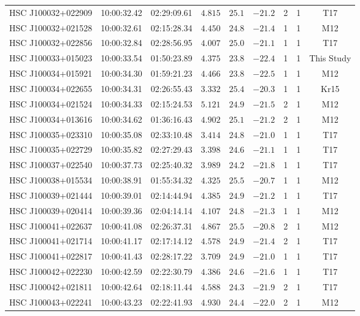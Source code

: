\documentclass[]{pasj01}
\begin{document}
{\begin{longtable}{ccccccccc}
HSC J100032+022909 & 10:00:32.42 & 02:29:09.61 & $4.815$ & $25.1$ & $-21.2$ & 2 & 1 & T17 \\
HSC J100032+021528 & 10:00:32.61 & 02:15:28.34 & $4.450$ & $24.8$ & $-21.4$ & 1 & 1 & M12 \\
HSC J100032+022856 & 10:00:32.84 & 02:28:56.95 & $4.007$ & $25.0$ & $-21.1$ & 1 & 1 & T17 \\
HSC J100033+015023 & 10:00:33.54 & 01:50:23.89 & $4.375$ & $23.8$ & $-22.4$ & 1 & 1 & This Study \\
HSC J100034+015921 & 10:00:34.30 & 01:59:21.23 & $4.466$ & $23.8$ & $-22.5$ & 1 & 1 & M12 \\
HSC J100034+022655 & 10:00:34.31 & 02:26:55.43 & $3.332$ & $25.4$ & $-20.3$ & 1 & 1 & Kr15 \\
HSC J100034+021524 & 10:00:34.33 & 02:15:24.53 & $5.121$ & $24.9$ & $-21.5$ & 2 & 1 & M12 \\
HSC J100034+013616 & 10:00:34.62 & 01:36:16.43 & $4.902$ & $25.1$ & $-21.2$ & 2 & 1 & M12 \\
HSC J100035+023310 & 10:00:35.08 & 02:33:10.48 & $3.414$ & $24.8$ & $-21.0$ & 1 & 1 & T17 \\
HSC J100035+022729 & 10:00:35.82 & 02:27:29.43 & $3.398$ & $24.6$ & $-21.1$ & 1 & 1 & T17 \\
HSC J100037+022540 & 10:00:37.73 & 02:25:40.32 & $3.989$ & $24.2$ & $-21.8$ & 1 & 1 & T17 \\
HSC J100038+015534 & 10:00:38.91 & 01:55:34.32 & $4.325$ & $25.5$ & $-20.7$ & 1 & 1 & M12 \\
HSC J100039+021444 & 10:00:39.01 & 02:14:44.94 & $4.385$ & $24.9$ & $-21.2$ & 1 & 1 & T17 \\
HSC J100039+020414 & 10:00:39.36 & 02:04:14.14 & $4.107$ & $24.8$ & $-21.3$ & 1 & 1 & M12 \\
HSC J100041+022637 & 10:00:41.08 & 02:26:37.31 & $4.867$ & $25.5$ & $-20.8$ & 2 & 1 & M12 \\
HSC J100041+021714 & 10:00:41.17 & 02:17:14.12 & $4.578$ & $24.9$ & $-21.4$ & 2 & 1 & T17 \\
HSC J100041+022817 & 10:00:41.43 & 02:28:17.22 & $3.709$ & $24.9$ & $-21.0$ & 1 & 1 & T17 \\
HSC J100042+022230 & 10:00:42.59 & 02:22:30.79 & $4.386$ & $24.6$ & $-21.6$ & 1 & 1 & T17 \\
HSC J100042+021811 & 10:00:42.64 & 02:18:11.44 & $4.588$ & $24.3$ & $-21.9$ & 2 & 1 & T17 \\
HSC J100043+022241 & 10:00:43.23 & 02:22:41.93 & $4.930$ & $24.4$ & $-22.0$ & 2 & 1 & M12 \\

\end{longtable}}
\end{document}
